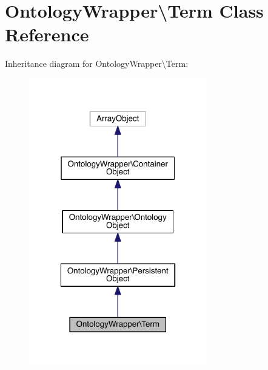 \hypertarget{class_ontology_wrapper_1_1_term}{\section{Ontology\-Wrapper\textbackslash{}Term Class Reference}
\label{class_ontology_wrapper_1_1_term}
}


Inheritance diagram for Ontology\-Wrapper\textbackslash{}Term\-:
\nopagebreak
\begin{figure}[H]
\begin{center}
\leavevmode
\includegraphics[width=220pt]{class_ontology_wrapper_1_1_term__inherit__graph}
\end{center}
\end{figure}


